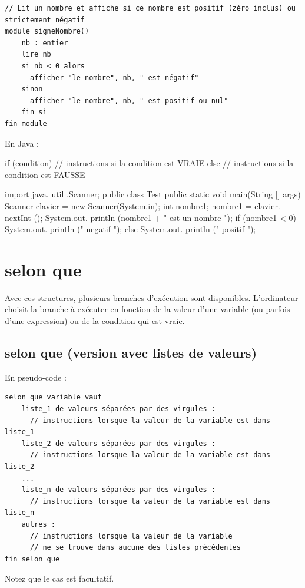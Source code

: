 \documentclass[11pt,a4paper]{article}
\begin{document}
            \par
        \begin{verbatim}
// Lit un nombre et affiche si ce nombre est positif (zéro inclus) ou strictement négatif
module signeNombre()
    nb : entier
    lire nb
    si nb < 0 alors
      afficher "le nombre", nb, " est négatif"
    sinon
      afficher "le nombre", nb, " est positif ou nul"
    fin si
fin module
    \end{verbatim}En Java :
            \par
        \begin{Java}
if (condition) { 
      // instructions si la condition est VRAIE
} else { 
      // instructions si la condition est FAUSSE
} 
      \end{Java}\begin{Java}
import java. util .Scanner;
public class Test {
    public static void main(String [] args) {
      Scanner clavier = new Scanner(System.in);
      int nombre1;
      nombre1 = clavier. nextInt ();
      System.out. println (nombre1 + " est un nombre ");
      if (nombre1 < 0) {
        System.out. println (" negatif ");
      } else {
        System.out. println (" positif ");
      }
    }
}
    \end{Java}\section{selon que}Avec ces structures, plusieurs branches d'ex\'ecution sont disponibles. L'ordinateur choisit la
    branche \`a ex\'ecuter en fonction de la valeur d'une variable (ou parfois d'une expression) ou
    de la condition qui est vraie.\subsection{selon que (version avec listes de valeurs)}En pseudo-code :
            \par
        \begin{verbatim}
selon que variable vaut
    liste_1 de valeurs séparées par des virgules :
      // instructions lorsque la valeur de la variable est dans liste_1
    liste_2 de valeurs séparées par des virgules :
      // instructions lorsque la valeur de la variable est dans liste_2
    ...
    liste_n de valeurs séparées par des virgules :
      // instructions lorsque la valeur de la variable est dans liste_n
    autres :
      // instructions lorsque la valeur de la variable
      // ne se trouve dans aucune des listes précédentes
fin selon que
      \end{verbatim}Notez que le cas \verb@autres@ est facultatif.
            \par
        
\end{document}
